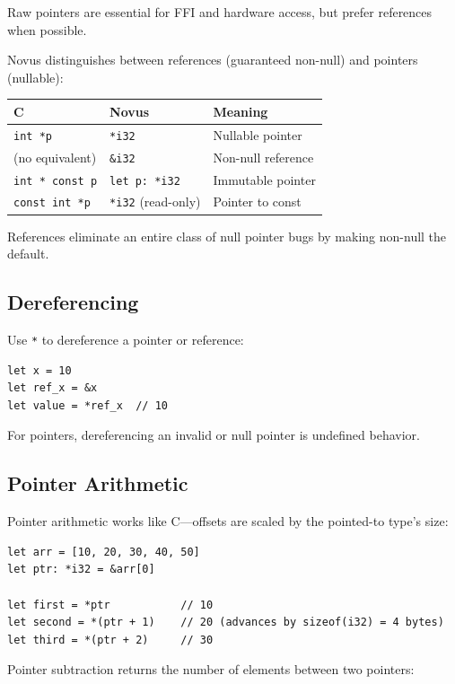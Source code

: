 Raw pointers are essential for FFI and hardware access, but prefer references when possible.

\begin{comingfromc}
Novus distinguishes between references (guaranteed non-null) and pointers (nullable):

\begin{tabular}{lll}
\textbf{C} & \textbf{Novus} & \textbf{Meaning} \\
\hline
\texttt{int *p} & \texttt{*i32} & Nullable pointer \\
(no equivalent) & \texttt{\&i32} & Non-null reference \\
\texttt{int * const p} & \texttt{let p: *i32} & Immutable pointer \\
\texttt{const int *p} & \texttt{*i32} (read-only) & Pointer to const \\
\end{tabular}

References eliminate an entire class of null pointer bugs by making non-null the default.
\end{comingfromc}

\subsection{Dereferencing}

Use \texttt{*} to dereference a pointer or reference:

\begin{lstlisting}
let x = 10
let ref_x = &x
let value = *ref_x  // 10
\end{lstlisting}

For pointers, dereferencing an invalid or null pointer is undefined behavior.

\subsection{Pointer Arithmetic}

Pointer arithmetic works like C---offsets are scaled by the pointed-to type's size:

\begin{lstlisting}
let arr = [10, 20, 30, 40, 50]
let ptr: *i32 = &arr[0]

let first = *ptr           // 10
let second = *(ptr + 1)    // 20 (advances by sizeof(i32) = 4 bytes)
let third = *(ptr + 2)     // 30
\end{lstlisting}

Pointer subtraction returns the number of elements between two pointers:

